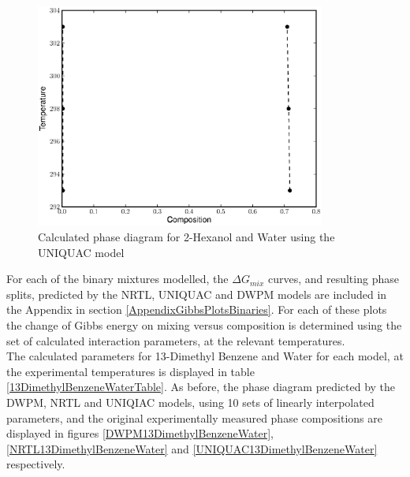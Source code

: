\begin{figure}[hp]
\centering
\includegraphics[width = 0.85\textwidth]{Results_Parts/BinaryParams/2-hexanol-water/UNIQUAC/PhaseDiagram.eps}
\caption{Calculated phase diagram for 2-Hexanol and Water using the UNIQUAC model} \label{UNIQUAC2-hexanol-water}
\end{figure}	

\clearpage 

For each of the binary mixtures modelled, the $\Delta G_{mix}$ curves, and resulting phase splits, predicted by the NRTL, UNIQUAC and DWPM models are included in the Appendix in section \ref{AppendixGibbsPlotsBinaries}. For each of these plots the change of Gibbs energy on mixing versus composition is determined using the set of calculated interaction parameters, at the relevant temperatures. \\



The calculated parameters for 13-Dimethyl Benzene and Water for each model, at the experimental temperatures is displayed in table \ref{13DimethylBenzeneWaterTable}. As before, the phase diagram predicted by the DWPM, NRTL and UNIQIAC models, using 10 sets of linearly interpolated parameters, and the original experimentally measured phase compositions are displayed in figures \ref{DWPM13DimethylBenzeneWater}, \ref{NRTL13DimethylBenzeneWater} and \ref{UNIQUAC13DimethylBenzeneWater} respectively.\\

